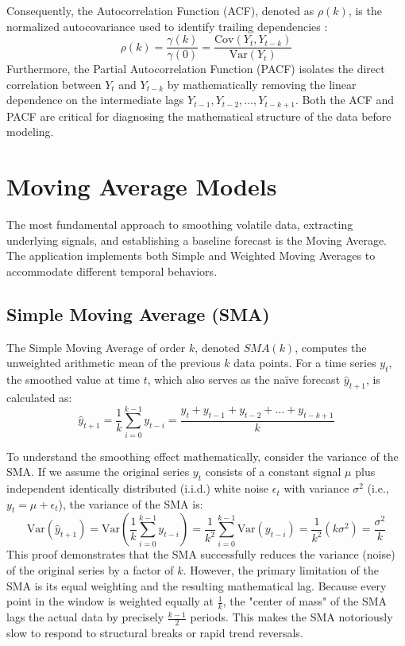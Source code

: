 \documentclass[11pt, a4paper]{report}
\begin{document}
Consequently, the Autocorrelation Function (ACF), denoted as $\rho(k)$, is the normalized autocovariance used to identify trailing dependencies \cite{Hamilton1994}:
\begin{equation}
    \rho(k) = \frac{\gamma(k)}{\gamma(0)} = \frac{\text{Cov}(Y_t, Y_{t-k})}{\text{Var}(Y_t)}
\end{equation}
Furthermore, the Partial Autocorrelation Function (PACF) isolates the direct correlation between $Y_t$ and $Y_{t-k}$ by mathematically removing the linear dependence on the intermediate lags $Y_{t-1}, Y_{t-2}, \dots, Y_{t-k+1}$. Both the ACF and PACF are critical for diagnosing the mathematical structure of the data before modeling.

\section{Moving Average Models}
The most fundamental approach to smoothing volatile data, extracting underlying signals, and establishing a baseline forecast is the Moving Average. The application implements both Simple and Weighted Moving Averages to accommodate different temporal behaviors.

\subsection{Simple Moving Average (SMA)}
The Simple Moving Average of order $k$, denoted $SMA(k)$, computes the unweighted arithmetic mean of the previous $k$ data points. For a time series $y_t$, the smoothed value at time $t$, which also serves as the na\"ive forecast $\hat{y}_{t+1}$, is calculated as:
\begin{equation}
    \hat{y}_{t+1} = \frac{1}{k} \sum_{i=0}^{k-1} y_{t-i} = \frac{y_t + y_{t-1} + y_{t-2} + \dots + y_{t-k+1}}{k}
\end{equation}

To understand the smoothing effect mathematically, consider the variance of the SMA. If we assume the original series $y_t$ consists of a constant signal $\mu$ plus independent identically distributed (i.i.d.) white noise $\epsilon_t$ with variance $\sigma^2$ (i.e., $y_t = \mu + \epsilon_t$), the variance of the SMA is:
\begin{equation}
    \text{Var}(\hat{y}_{t+1}) = \text{Var}\left( \frac{1}{k} \sum_{i=0}^{k-1} y_{t-i} \right) = \frac{1}{k^2} \sum_{i=0}^{k-1} \text{Var}(y_{t-i}) = \frac{1}{k^2} (k \sigma^2) = \frac{\sigma^2}{k}
\end{equation}
This proof demonstrates that the SMA successfully reduces the variance (noise) of the original series by a factor of $k$. However, the primary limitation of the SMA is its equal weighting and the resulting mathematical lag. Because every point in the window is weighted equally at $\frac{1}{k}$, the "center of mass" of the SMA lags the actual data by precisely $\frac{k-1}{2}$ periods. This makes the SMA notoriously slow to respond to structural breaks or rapid trend reversals.
\end{document}
